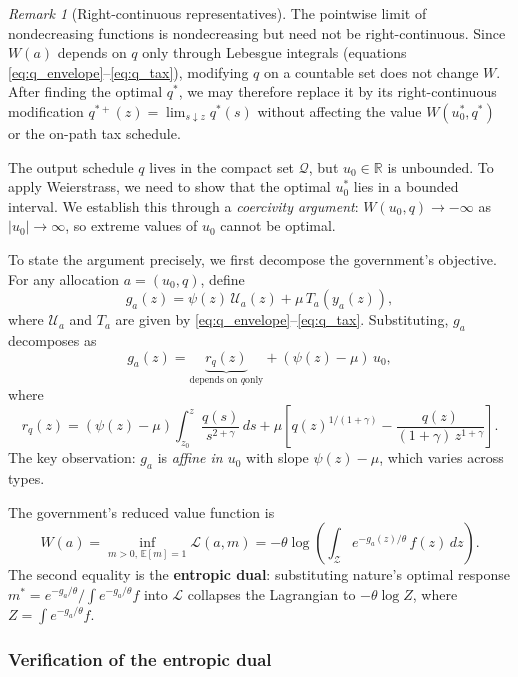 \documentclass[12pt,a4paper]{article}
\theoremstyle{definition}
\theoremstyle{plain}
\theoremstyle{remark}
\newtheorem{remark}{Remark}[section]
\newcommand{\R}{\mathbb{R}}
\newcommand{\E}{\mathbb{E}}
\newcommand{\zlow}{z_{\scriptscriptstyle 0}}
\newcommand{\calU}{\mathcal{U}}
\newcommand{\calZ}{\mathcal{Z}}
\newcommand{\calL}{\mathcal{L}}
\begin{document}
\begin{remark}[Right-continuous representatives]
\label{rem:rc}
The pointwise limit of nondecreasing functions is
nondecreasing but need not be right-continuous.
Since $W(a)$ depends on $q$ only through Lebesgue
integrals (equations
\eqref{eq:q_envelope}--\eqref{eq:q_tax}), modifying
$q$ on a countable set does not change $W$.
After finding the optimal $q^*$, we may therefore
replace it by its right-continuous modification
$q^{*+}(z) = \lim_{s \downarrow z} q^*(s)$
without affecting the value $W(u_0^*, q^*)$ or
the on-path tax schedule.
\end{remark}

The output schedule $q$ lives in the compact set
$\mathcal{Q}$, but $u_0 \in \R$ is unbounded.  To apply
Weierstrass, we need to show that the optimal $u_0^*$
lies in a bounded interval.  We establish this through a
\emph{coercivity argument}: $W(u_0, q) \to -\infty$ as
$|u_0| \to \infty$, so extreme values of $u_0$ cannot be
optimal.

To state the argument precisely, we first decompose the
government's objective.  For any allocation
$a = (u_0, q)$, define
\begin{equation}
\label{eq:g_def}
  g_a(z) = \psi(z)\,\calU_a(z) + \mu\,T_a(y_a(z)),
\end{equation}
where $\calU_a$ and $T_a$ are given by
\eqref{eq:q_envelope}--\eqref{eq:q_tax}.  Substituting,
$g_a$ decomposes as
\begin{equation}
\label{eq:g_decompose}
  g_a(z) = \underbrace{r_q(z)}_{\text{depends on $q$
  only}} + (\psi(z) - \mu)\,u_0,
\end{equation}
where
\[
  r_q(z) = (\psi(z){-}\mu)\!\int_{\zlow}^z
  \frac{q(s)}{s^{2+\gamma}}\,ds
  + \mu\!\left[q(z)^{1/(1+\gamma)}
  - \frac{q(z)}{(1{+}\gamma)\,z^{1+\gamma}}\right].
\]
The key observation: $g_a$ is \emph{affine in $u_0$} with
slope $\psi(z) - \mu$, which varies across types.

The government's reduced value function is
\begin{equation}
\label{eq:W_def}
  W(a) = \inf_{m > 0,\,\E[m]=1} \calL(a, m)
  = -\theta\log\!\left(
    \int_\calZ e^{-g_a(z)/\theta}\,f(z)\,dz
  \right).
\end{equation}
The second equality is the \textbf{entropic dual}:
substituting nature's optimal response
$m^* = e^{-g_a/\theta}/\!\int e^{-g_a/\theta}f$
into $\calL$ collapses the Lagrangian to $-\theta\log Z$,
where $Z = \int e^{-g_a/\theta}f$.

\subsubsection*{Verification of the entropic dual}
\end{document}
